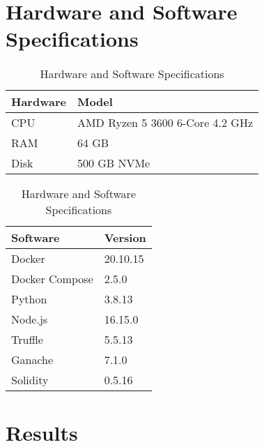 


\section{Hardware and Software Specifications}

\begin{table}[!h]
    \begin{subtable}[h]{0.59\textwidth}
        \centering
        \begin{tabular}{l|l} \hline \hline
            Hardware & Model                                    \\ \hline \hline
            CPU      & AMD Ryzen 5 3600 6-Core 4.2 GHz          \\ \hline
            RAM      & 64 GB                                    \\ \hline
            Disk     & 500 GB NVMe                              \\ \hline
        \end{tabular}
        \caption{Hardware}
        \label{evaluation:hardware}
    \end{subtable}
    \hfill
    \begin{subtable}[h]{0.39\textwidth}
        \centering
        \begin{tabular}{l|l} \hline \hline
            Software            & Version               \\ \hline \hline
            Docker              & 20.10.15              \\ \hline
            Docker Compose      & 2.5.0                 \\ \hline
            Python              & 3.8.13               \\ \hline
            Node.js             & 16.15.0               \\ \hline
            Truffle             & 5.5.13               \\ \hline
            Ganache             & 7.1.0               \\ \hline
            Solidity            & 0.5.16               \\ \hline
        \end{tabular}
        \caption{Software}
        \label{evaluation:software}
     \end{subtable}
     \caption{Hardware and Software Specifications}
     \label{tab:temps}
\end{table}

\section{Results}

